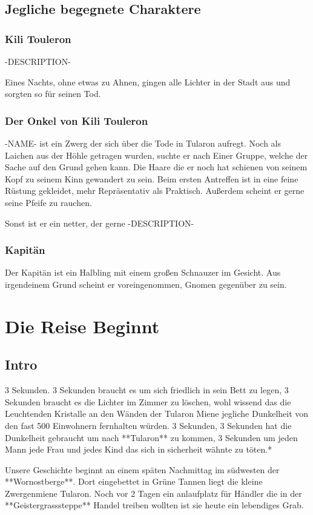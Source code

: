 \documentclass[10pt,twoside,twocolumn,openany]{book}
\begin{document}
	\newpage
	\section{Jegliche begegnete Charaktere}
	\subsection{Kili Touleron}
	-DESCRIPTION-
	
	Eines Nachts, ohne etwas zu Ahnen, gingen alle Lichter in der Stadt aus und sorgten so für seinen Tod.
	
	\subsection{Der Onkel von Kili Touleron}
	\label{Onkel}
	-NAME- ist ein Zwerg der sich über die Tode in Tularon aufregt. Noch als Laichen aus der Höhle getragen wurden, suchte er nach Einer Gruppe, welche der Sache auf den Grund gehen kann. Die Haare die er noch hat schienen von seinem Kopf zu seinem Kinn gewandert zu sein. Beim ersten Antreffen ist in eine feine Rüstung gekleidet, mehr Repräsentativ als Praktisch. Außerdem scheint er gerne seine Pfeife zu rauchen.

	Sonst ist er ein netter, der gerne -DESCRIPTION-
	
	\subsection{Kapitän}
	Der Kapitän ist ein Halbling mit einem großen Schnauzer im Gesicht. Aus irgendeinem Grund scheint er voreingenommen, Gnomen gegenüber zu sein. 
	
	\chapter{Die Reise Beginnt}
	\section{Intro}
	3 Sekunden. 3 Sekunden braucht es um sich friedlich in sein Bett zu legen, 3 Sekunden braucht es die Lichter im Zimmer zu löschen, wohl wissend das die Leuchtenden Kristalle an den Wänden der Tularon Miene jegliche Dunkelheit von den fast 500 Einwohnern fernhalten würden.
	3 Sekunden, 3 Sekunden hat die Dunkelheit gebraucht um nach **Tularon** zu kommen, 3 Sekunden um jeden Mann jede Frau und jedes Kind das sich in sicherheit wähnte zu töten.*
	
	Unsere Geschichte beginnt an einem späten Nachmittag im südwesten der **Wornostberge**. Dort eingebettet in Grüne Tannen liegt die kleine Zwergenmiene Tularon. Noch vor 2 Tagen ein anlaufplatz für Händler die in der **Geistergrasssteppe** Handel treiben wollten ist sie heute ein lebendiges Grab.
	
\end{document}
